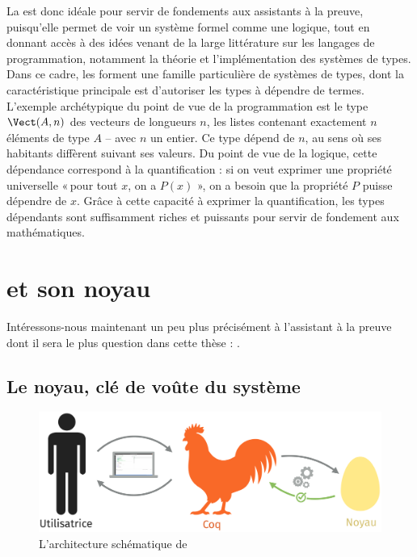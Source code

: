 La  est donc idéale pour servir de fondements aux
assistants à la preuve, puisqu’elle permet de voir un système formel
comme une logique, tout en donnant accès à des idées venant de
la large littérature sur les langages de programmation, notamment
la théorie et l’implémentation des systèmes de types.
Dans ce cadre, les  
forment une famille particulière de systèmes de types, dont la
caractéristique principale est d’autoriser les types à dépendre de termes.
L’exemple archétypique du point de vue de la  programmation est le type
$\Vect(A,n)$ des vecteurs de longueurs $n$,
les listes contenant exactement $n$ éléments de type $A$ – avec $n$ un entier.
Ce type dépend de $n$, au sens où ses habitants diffèrent suivant ses valeurs.
Du point de vue de la logique, cette
dépendance correspond à la quantification : si on veut exprimer
une propriété universelle « pour tout $x$, on a $P(x)$ », on a besoin que la propriété $P$
puisse dépendre de $x$.
Grâce à cette capacité à exprimer la quantification,
les types dépendants sont suffisamment riches et puissants pour
servir de fondement aux mathématiques.

\section{ et son noyau}
\label{sec:intro-coq}

Intéressons-nous maintenant un peu plus précisément à l’assistant à la
preuve dont il sera le plus question dans cette thèse : .

\subsection[Le noyau]{Le noyau, clé de voûte du système}

\begin{figure}[h]
  \centering
  \includegraphics{./figures/coq-kernel-fr.pdf}

  \caption{L’architecture schématique de }
  \label{fig:coq}
\end{figure}


